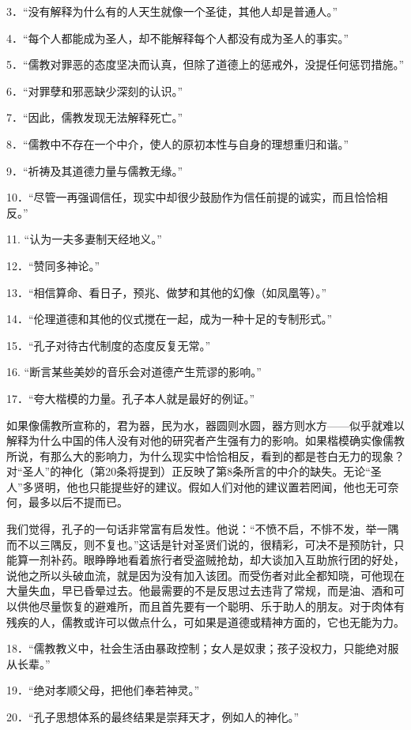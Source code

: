 \documentclass[12pt,oneside]{book}
\begin{document}
\begin{common-format}
3．“没有解释为什么有的人天生就像一个圣徒，其他人却是普通人。” 

4．“每个人都能成为圣人，却不能解释每个人都没有成为圣人的事实。” 

5．“儒教对罪恶的态度坚决而认真，但除了道德上的惩戒外，没提任何惩罚措施。” 

6．“对罪孽和邪恶缺少深刻的认识。” 

7．“因此，儒教发现无法解释死亡。” 

8．“儒教中不存在一个中介，使人的原初本性与自身的理想重归和谐。” 

9．“祈祷及其道德力量与儒教无缘。” 

10．“尽管一再强调信任，现实中却很少鼓励作为信任前提的诚实，而且恰恰相反。” 

11. “认为一夫多妻制天经地义。” 

12．“赞同多神论。” 

13．“相信算命、看日子，预兆、做梦和其他的幻像（如凤凰等）。” 

14．“伦理道德和其他的仪式搅在一起，成为一种十足的专制形式。” 

15．“孔子对待古代制度的态度反复无常。” 

16. “断言某些美妙的音乐会对道德产生荒谬的影响。” 

17．“夸大楷模的力量。孔子本人就是最好的例证。” 

如果像儒教所宣称的，君为器，民为水，器圆则水圆，器方则水方——似乎就难以解释为什么中国的伟人没有对他的研究者产生强有力的影响。如果楷模确实像儒教所说，有那么大的影响力，为什么现实中恰恰相反，看到的都是苍白无力的现象？对“圣人”的神化（第20条将提到）正反映了第8条所言的中介的缺失。无论“圣人”多贤明，他也只能提些好的建议。假如人们对他的建议置若罔闻，他也无可奈何，最多以后不提而已。 

我们觉得，孔子的一句话非常富有启发性。他说：“不愤不启，不悱不发，举一隅而不以三隅反，则不复也。”这话是针对圣贤们说的，很精彩，可决不是预防针，只能算一剂补药。眼睁睁地看着旅行者受盗贼抢劫，却大谈加入互助旅行团的好处，说他之所以头破血流，就是因为没有加入该团。而受伤者对此全都知晓，可他现在大量失血，早已昏晕过去。他最需要的不是反思过去违背了常规，而是油、酒和可以供他尽量恢复的避难所，而且首先要有一个聪明、乐于助人的朋友。对于肉体有残疾的人，儒教或许可以做点什么，可如果是道德或精神方面的，它也无能为力。 

18．“儒教教义中，社会生活由暴政控制；女人是奴隶；孩子没权力，只能绝对服从长辈。” 

19．“绝对孝顺父母，把他们奉若神灵。” 

20．“孔子思想体系的最终结果是崇拜天才，例如人的神化。” 


\end{common-format}
\end{document}
